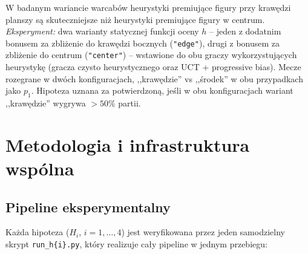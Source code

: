 \documentclass[11pt,a4paper]{article}
\begin{document}
\begin{description}[style=nextline,leftmargin=0pt]
    \item[H4 (krawędzie vs środek planszy).] W badanym wariancie warcabów
        heurystyki premiujące figury przy krawędzi planszy są
        skuteczniejsze niż heurystyki premiujące figury w centrum.
        \emph{Eksperyment:} dwa warianty statycznej
        funkcji oceny $h$ -- jeden z dodatnim bonusem za zbliżenie do
        krawędzi bocznych (\texttt{"edge"}), drugi z bonusem za zbliżenie
        do centrum (\texttt{"center"}) -- wstawione do obu graczy
        wykorzystujących heurystykę (gracza czysto heurystycznego oraz UCT
        + progressive bias). Mecze rozegrane w dwóch konfiguracjach,
        ,,krawędzie'' vs ,,środek'' w obu przypadkach jako $p_1$. Hipoteza
        uznana za potwierdzoną, jeśli w obu konfiguracjach wariant
        ,,krawędzie'' wygrywa $> 50\%$ partii.
\end{description}

\section{Metodologia i infrastruktura wspólna}
\label{sec:metodologia}

\subsection{Pipeline eksperymentalny}

Każda hipoteza ($H_i$, $i=1,\dots,4$) jest weryfikowana przez jeden
samodzielny skrypt \texttt{run\_h\{i\}.py}, który realizuje cały
pipeline w jednym przebiegu:
\end{document}
